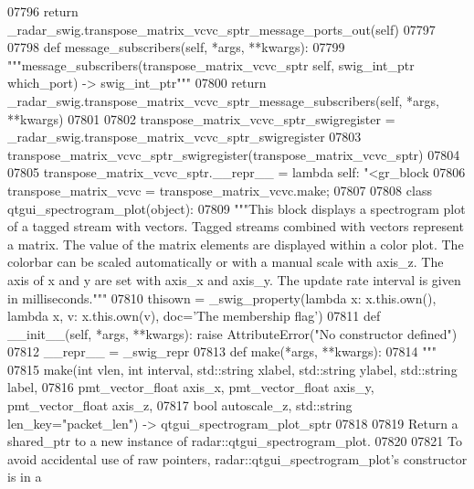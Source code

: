 \begin{DoxyCode}
{{{{{{{{{{{{{{{{{{{{{{{{{07796         \textcolor{keywordflow}{return} \_radar\_swig.transpose\_matrix\_vcvc\_sptr\_message\_ports\_out(self)
07797 
07798     \textcolor{keyword}{def }message_subscribers(self, *args, **kwargs):
07799         \textcolor{stringliteral}{"""message\_subscribers(transpose\_matrix\_vcvc\_sptr self, swig\_int\_ptr which\_port) -> swig\_int\_ptr"""}
07800         \textcolor{keywordflow}{return} \_radar\_swig.transpose\_matrix\_vcvc\_sptr\_message\_subscribers(self, *args, **kwargs)
07801 
07802 transpose\_matrix\_vcvc\_sptr\_swigregister = \_radar\_swig.transpose\_matrix\_vcvc\_sptr\_swigregister
07803 transpose_matrix_vcvc_sptr_swigregister(transpose\_matrix\_vcvc\_sptr)
07804 
07805 transpose\_matrix\_vcvc\_sptr.\_\_repr\_\_ = \textcolor{keyword}{lambda} self: \textcolor{stringliteral}{"<gr\_block %
07806 transpose\_matrix\_vcvc = transpose\_matrix\_vcvc.make;
07807 
07808 \textcolor{keyword}{class }qtgui_spectrogram_plot(object):
07809     \textcolor{stringliteral}{"""This block displays a spectrogram plot of a tagged stream with vectors. Tagged streams combined with
       vectors represent a matrix. The value of the matrix elements are displayed within a color plot. The
       colorbar can be scaled automatically or with a manual scale with axis\_z. The axis of x and y are set with axis\_x
       and axis\_y. The update rate interval is given in milliseconds."""}
07810     thisown = _swig_property(\textcolor{keyword}{lambda} x: x.this.own(), \textcolor{keyword}{lambda} x, v: x.this.own(v), doc=\textcolor{stringliteral}{'The membership flag'})
07811     \textcolor{keyword}{def }__init__(self, *args, **kwargs): \textcolor{keywordflow}{raise} AttributeError(\textcolor{stringliteral}{"No constructor defined"})
07812     \_\_repr\_\_ = \_swig\_repr
07813     \textcolor{keyword}{def }make(*args, **kwargs):
07814         \textcolor{stringliteral}{"""}
07815 \textcolor{stringliteral}{        make(int vlen, int interval, std::string xlabel, std::string ylabel, std::string label, }
07816 \textcolor{stringliteral}{            pmt\_vector\_float axis\_x, pmt\_vector\_float axis\_y, pmt\_vector\_float axis\_z, }
07817 \textcolor{stringliteral}{            bool autoscale\_z, std::string len\_key="packet\_len") -> qtgui\_spectrogram\_plot\_sptr}
07818 \textcolor{stringliteral}{}
07819 \textcolor{stringliteral}{        Return a shared\_ptr to a new instance of radar::qtgui\_spectrogram\_plot.}
07820 \textcolor{stringliteral}{}
07821 \textcolor{stringliteral}{        To avoid accidental use of raw pointers, radar::qtgui\_spectrogram\_plot's constructor is in a
}}}}}}}}}}}}}}}}}}}}}}}}}}}
\end{DoxyCode}
